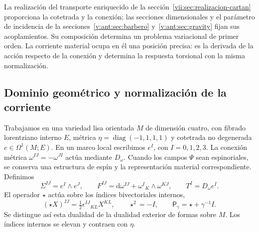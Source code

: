 La realización del transporte enriquecido de la
sección~\ref{vii:sec:realizacion-cartan} proporciona la cotetrada y la
conexión; las secciones dimensionales y el parámetro de incidencia de la
secciones~\ref{v:ant:sec:barbero} y~\ref{v:ant:sec:gravity} fijan sus acoplamientos. Su composición
determina un problema variacional de primer orden. La corriente material
ocupa en él una posición precisa: es la derivada de la acción respecto de
la conexión y determina la respuesta torsional con la misma normalización.

\subsection{Dominio geométrico y normalización de la corriente}
\label{vii:subsec:dominio-corriente-cartan}

Trabajamos en una variedad lisa orientada \(M\) de dimensión cuatro,
con fibrado lorentziano interno \(E\), métrica
\(\eta=\operatorname{diag}(-1,1,1,1)\) y cotetrada no degenerada
\(e\in\Omega^1(M;E)\). En un marco local escribimos
\(e^I\), con \(I=0,1,2,3\). La conexión métrica
\(\omega^{IJ}=-\omega^{JI}\) actúa mediante \(D_\omega\).
Cuando los campos \(\Psi\) sean espinoriales, se conserva una estructura
de espín y la representación material correspondiente. Definimos
\begin{equation}
 \Sigma^{IJ}=e^I\wedge e^J,\qquad
 F^{IJ}=\mathrm d\omega^{IJ}+\omega^I{}_{K}\wedge\omega^{KJ},
 \qquad T^I=D_\omega e^I.
 \label{vii:eq:campos-cartan}
\end{equation}
El operador \(\star\) actúa sobre los índices bivectoriales internos,
\begin{equation}
 (\star X)^{IJ}=\tfrac12\epsilon^{IJ}{}_{KL}X^{KL},
 \qquad \star^2=-I,\qquad
 \mathsf P_\gamma=\star+\gamma^{-1}I.
 \label{vii:eq:operador-holst}
\end{equation}
Se distingue así esta dualidad de la dualidad exterior de formas sobre
\(M\). Los índices internos se elevan y contraen con \(\eta\).

